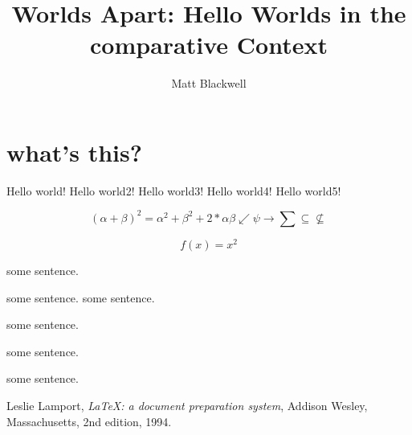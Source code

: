 \documentclass[a4paper, 12pt]{article}
\title{Worlds Apart: Hello Worlds in the comparative Context}
\author{Matt Blackwell}
\begin{document}
\maketitle
\section {what's this?}
Hello world!
Hello world2!
Hello world3!
Hello world4!
Hello world5!

\begin{equation}
    (\alpha + \beta)^2 = \alpha^2 + \beta^2 + 2 * \alpha\beta
    \swarrow
    \psi
    \longrightarrow
    \sum
    \subseteq
    \not\subseteq
\end{equation}

$$ f(x)=x^2 $$

some sentence. \cite{lamport94}

some sentence. \cite[chapter, p. 215]{lamport94}
some sentence. \cite[chapter, p.~215]{lamport94}

some sentence. \cite{greenwade93}

some sentence. \cite{thomas2009}

some sentence. \cite{website:fermentas-lambda}

\begin{thebibliography}{99}

    Leslie Lamport,
    \emph{\LaTeX: a document preparation system},
    Addison Wesley, Massachusetts,
    2nd edition,
    1994.

\end{thebibliography}



\end{document}
